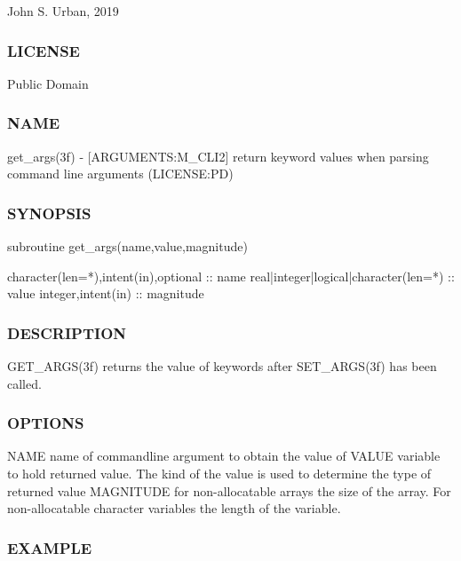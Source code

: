 John S. Urban, 2019 \subsubsection*{L\+I\+C\+E\+N\+SE}

Public Domain \subsubsection*{N\+A\+ME}

get\+\_\+args(3f) -\/ \mbox{[}A\+R\+G\+U\+M\+E\+N\+TS\+:M\+\_\+\+C\+L\+I2\mbox{]} return keyword values when parsing command line arguments (L\+I\+C\+E\+N\+SE\+:PD)

\subsubsection*{S\+Y\+N\+O\+P\+S\+IS}

\begin{DoxyVerb} subroutine get_args(name,value,magnitude)

  character(len=*),intent(in),optional  :: name
  real|integer|logical|character(len=*) :: value
  integer,intent(in) :: magnitude
\end{DoxyVerb}


\subsubsection*{D\+E\+S\+C\+R\+I\+P\+T\+I\+ON}

\begin{DoxyVerb} GET_ARGS(3f) returns the value of keywords after SET_ARGS(3f) has
 been called.
\end{DoxyVerb}


\subsubsection*{O\+P\+T\+I\+O\+NS}

\begin{DoxyVerb}  NAME       name of commandline argument to obtain the value of
  VALUE      variable to hold returned value. The kind of the value
             is used to determine the type of returned value
  MAGNITUDE  for non-allocatable arrays the size of the array. For
             non-allocatable character variables the length of the
             variable.
\end{DoxyVerb}
 \subsubsection*{E\+X\+A\+M\+P\+LE}

